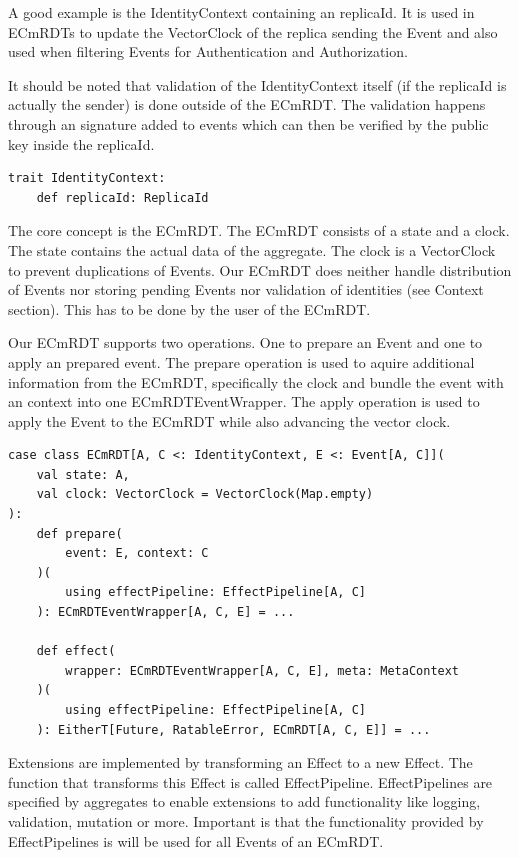 \documentclass[
	ngerman,
	ruledheaders=section,   %
	class=report,		    %
	thesis={type=bachelor}, %
	accentcolor=9c,			%
	custommargins=true,    %
	marginpar=false,        %
	parskip=half-,          %
	fontsize=11pt,          %
]{tudapub}
\begin{document}
A good example is the IdentityContext containing an replicaId. It is used in ECmRDTs to update the VectorClock of the replica sending the Event and also used when filtering Events for Authentication and Authorization.

It should be noted that validation of the IdentityContext itself (if the replicaId is actually the sender) is done outside of the ECmRDT. The validation happens through an signature added to events which can then be verified by the public key inside the replicaId.

\begin{lstlisting}
trait IdentityContext:
	def replicaId: ReplicaId
\end{lstlisting}

The core concept is the ECmRDT. The ECmRDT consists of a state and a clock. The state contains the actual data of the aggregate. The clock is a VectorClock to prevent duplications of Events. Our ECmRDT does neither handle distribution of Events nor storing pending Events nor validation of identities (see Context section). This has to be done by the user of the ECmRDT.

Our ECmRDT supports two operations. One to prepare an Event and one to apply an prepared event. The prepare operation is used to aquire additional information from the ECmRDT, specifically the clock and bundle the event with an context into one ECmRDTEventWrapper. The apply operation is used to apply the Event to the ECmRDT while also advancing the vector clock.

\begin{lstlisting}
case class ECmRDT[A, C <: IdentityContext, E <: Event[A, C]](
	val state: A,
	val clock: VectorClock = VectorClock(Map.empty)
):
	def prepare(
		event: E, context: C
	)(
		using effectPipeline: EffectPipeline[A, C]
	): ECmRDTEventWrapper[A, C, E] = ...

	def effect(
		wrapper: ECmRDTEventWrapper[A, C, E], meta: MetaContext
	)(
		using effectPipeline: EffectPipeline[A, C]
	): EitherT[Future, RatableError, ECmRDT[A, C, E]] = ...
\end{lstlisting}

Extensions are implemented by transforming an Effect to a new Effect. The function that transforms this Effect is called EffectPipeline. EffectPipelines are specified by aggregates to enable extensions to add functionality like logging, validation, mutation or more. Important is that the functionality provided by EffectPipelines is will be used for all Events of an ECmRDT. 
\end{document}

